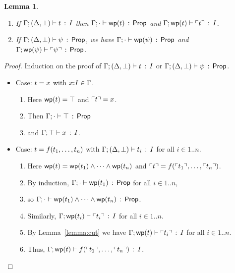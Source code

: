 \documentclass[10pt,a4paper]{article}
\newtheorem{lemma}[theorem]{Lemma}
\begin{document}
\clearpage

\begin{lemma}
\mbox{}
  \begin{enumerate}
  \item If $\Gamma;(\Delta,\bot) \vdash t\, :\, I$ then
    $\Gamma;\cdot \vdash \mathop{\mathsf{wp}}(t)\, :\, \mathsf{Prop}$ and
    $\Gamma;\mathop{\mathsf{wp}}(t) \vdash \ulcorner t \urcorner\, :\, I$.
  \item If $\Gamma;(\Delta,\bot) \vdash \psi\, :\, \mathsf{Prop}$, we have
    $\Gamma;\cdot \vdash \mathop{\mathsf{wp}}(\psi)\, :\, \mathsf{Prop}$ and $\Gamma;\mathop{\mathsf{wp}}(\psi) \vdash \ulcorner \psi \urcorner\, :\, \mathsf{Prop}$.
  \end{enumerate}
\end{lemma}

\begin{proof}
  \raggedright Induction on the proof of
  $\Gamma;(\Delta,\bot) \vdash t\, :\, I$ or $\Gamma;(\Delta,\bot) \vdash \psi\, :\, \mathsf{Prop}$.
  \begin{itemize}
  \item Case: $t = x$ with $x{:}I\in\Gamma$.  
    \begin{enumerate}
      \item
        Here $\mathop{\mathsf{wp}}(t) = \top$ and $\ulcorner t \urcorner = x$.
      \item
        Then $\Gamma;\cdot \vdash \top\, :\, \mathsf{Prop}$ 
      \item
        and $\Gamma;\top \vdash x\, :\, I$.
      \end{enumerate}
  \item Case: $t = f({t}_1,\ldots,{t}_{n})$ with
    $\Gamma;(\Delta,\bot) \vdash t_i\, :\, I$ for all $i\in1..n$.
    \begin{enumerate}
    \item
      Here $\mathop{\mathsf{wp}}(t) =
      \mathop{\mathsf{wp}}(t_1) \wedge \cdots \wedge \mathop{\mathsf{wp}}(t_n)$
      and $\ulcorner t \urcorner = f(\ulcorner t_1 \urcorner,\ldots,\ulcorner t_n \urcorner)$.
    \item 
    	By induction,
      $\Gamma;\cdot \vdash \mathop{\mathsf{wp}}(t_1)\, :\, \mathsf{Prop}$ for
      all $i\in1..n$, 
    \item 
    	so
    $\Gamma;\cdot \vdash \mathop{\mathsf{wp}}(t_1) \wedge \cdots \wedge \mathop{\mathsf{wp}}(t_n)\, :\, \mathsf{Prop}$.
    \item 
    Similarly, $\Gamma;\mathop{\mathsf{wp}}(t_i) \vdash \ulcorner t_i \urcorner\, :\, I$ for
      all $i\in1..n$.  
    \item
      By Lemma~\ref{lemma:cut} we have
      $\Gamma;\mathop{\mathsf{wp}}(t) \vdash \ulcorner t_i \urcorner\, :\, I$ for
      all $i\in1..n$.  
    \item Thus,
      $\Gamma;\mathop{\mathsf{wp}}(t) \vdash f(\ulcorner t_1 \urcorner,\ldots,\ulcorner t_n \urcorner)\, :\, I$.  
    \end{enumerate}
    

\end{itemize}
\end{proof}
\end{document}
